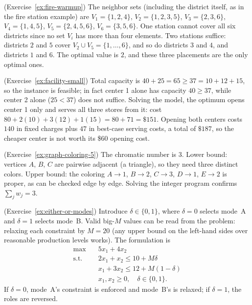 \begin{solution}(Exercise~\ref{ex:fire-warmup})
The neighbor sets (including the district itself, as in the fire station example) are $V_1 = \{1,2,4\}$, $V_2 = \{1,2,3,5\}$, $V_3 = \{2,3,6\}$, $V_4 = \{1,4,5\}$, $V_5 = \{2,4,5,6\}$, $V_6 = \{3,5,6\}$.  One station cannot cover all six districts since no set $V_i$ has more than four elements.  Two stations suffice: districts $2$ and $5$ cover $V_2 \cup V_5 = \{1,\dots,6\}$, and so do districts $3$ and $4$, and districts $1$ and $6$.  The optimal value is $2$, and these three placements are the only optimal ones.
\end{solution}

\begin{solution}(Exercise~\ref{ex:facility-small})
Total capacity is $40 + 25 = 65 \geq 37 = 10 + 12 + 15$, so the instance is feasible; in fact center 1 alone has capacity $40 \geq 37$, while center 2 alone ($25 < 37$) does not suffice.  Solving the model, the optimum opens center 1 only and serves all three stores from it: cost $80 + 2(10) + 3(12) + 1(15) = 80 + 71 = \$151$.  Opening both centers costs $140$ in fixed charges plus $47$ in best-case serving costs, a total of $\$187$, so the cheaper center is not worth its \$60 opening cost.
\end{solution}

\begin{solution}(Exercise~\ref{ex:graph-coloring-5})
The chromatic number is $3$.  Lower bound: vertices $A$, $B$, $C$ are pairwise adjacent (a triangle), so they need three distinct colors.  Upper bound: the coloring $A \to 1$, $B \to 2$, $C \to 3$, $D \to 1$, $E \to 2$ is proper, as can be checked edge by edge.  Solving the integer program confirms $\sum_j w_j = 3$.
\end{solution}

\begin{solution}(Exercise~\ref{ex:either-or-modes})
Introduce $\delta \in \{0,1\}$, where $\delta = 0$ selects mode~A and $\delta = 1$ selects mode~B.  Valid big-$M$ values can be read from the problem: relaxing each constraint by $M = 20$ (any upper bound on the left-hand sides over reasonable production levels works).  The formulation is
\[
\begin{aligned}
\max\quad & 5x_1 + 4x_2\\
\text{s.t.}\quad & 2x_1 + x_2 \leq 10 + M\delta\\
& x_1 + 3x_2 \leq 12 + M(1-\delta)\\
& x_1, x_2 \geq 0, \quad \delta \in \{0,1\}.
\end{aligned}
\]
If $\delta = 0$, mode~A's constraint is enforced and mode~B's is relaxed; if $\delta = 1$, the roles are reversed.
\end{solution}

